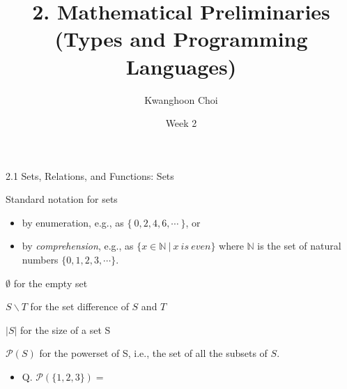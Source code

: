 \documentclass[table]{beamer}
\title[Types and Programming Languages]{2. Mathematical Preliminaries \\
(Types and Programming Languages)}
\author[K. Choi]{Kwanghoon Choi}
\institute[Chonnam National University]{
Software Languages and Systems Laboratory \\
	Chonnam National University}
\date{Week 2}
\begin{document}
\begin{frame}
	\titlepage
	
\end{frame}


\begin{frame}[t]{2.1 Sets, Relations, and Functions: Sets} \vspace{10pt}

Standard notation for sets 
\begin{itemize}
\item by enumeration, e.g., as $\{ \ 0, 2, 4, 6, \cdots  \ \}$, or 
\item by {\it comprehension}, e.g., as $\{ x \in \mathbb{N} \ | \ x \ is \ even \}$ where $\mathbb{N}$ is the set of natural numbers $\{0,1,2,3,\cdots\}$.
\end{itemize}

\vspace{10pt}

$\emptyset$ for the empty set
\vspace{10pt}

$S \backslash T$ for the set difference of $S$ and $T$
\vspace{10pt}

$|S|$ for the size of a set S
\vspace{10pt}

$\mathcal{P}(S)$ for the powerset of S, i.e., the set of all the subsets of $S$. 

\begin{itemize}
\item Q. $\mathcal{P}(\{1,2,3\}) = $
\end{itemize}

\end{frame}
\end{document}
